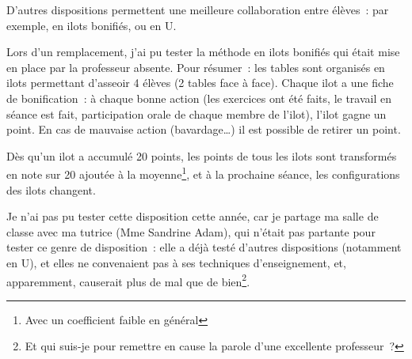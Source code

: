 D'autres dispositions permettent une meilleure collaboration entre élèves : par
exemple, en ilots bonifiés\cite{ilots_bonifies}, ou en U\cite{amenagement_classe}.

Lors d'un remplacement, j'ai pu tester la méthode en ilots bonifiés qui était mise
en place par la professeur absente. Pour résumer : les tables sont organisés
en ilots permettant d'asseoir 4 élèves (2 tables face à face). Chaque ilot a une
fiche de bonification : à chaque bonne action (les exercices ont été faits, le travail
en séance est fait, participation orale de chaque membre de l'ilot), l'ilot gagne un point.
En cas de mauvaise action (bavardage…) il est possible de retirer un point.

Dès qu'un ilot a accumulé 20 points, les points de tous les ilots sont transformés
en note sur 20 ajoutée à la moyenne\footnote{Avec un coefficient faible en général},
et à la prochaine séance, les configurations des ilots changent.

Je n'ai pas pu tester cette disposition cette année, car je partage ma salle de classe
avec ma tutrice (Mme Sandrine Adam), qui n'était pas partante pour tester ce genre de disposition : elle a déjà testé d'autres dispositions (notamment en U), et elles
ne convenaient pas à ses techniques d'enseignement, et, apparemment, causerait plus
de mal que de bien\footnote{Et qui suis-je pour remettre en cause la parole d'une
excellente professeur ?}.
